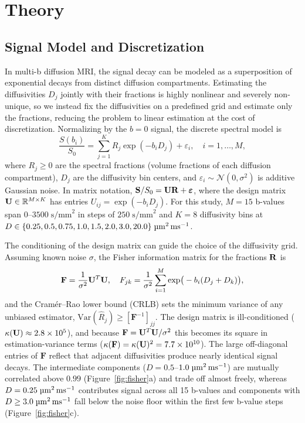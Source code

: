 \section{Theory}

\subsection{Signal Model and Discretization}

In multi-b diffusion MRI, the signal decay can be modeled as a superposition of exponential decays from distinct diffusion compartments. Estimating the diffusivities $D_j$ jointly with their fractions is highly nonlinear and severely non-unique, so we instead fix the diffusivities on a predefined grid and estimate only the fractions, reducing the problem to linear estimation at the cost of discretization. Normalizing by the $b = 0$ signal, the discrete spectral model is
%
\begin{equation}
  \frac{S(b_i)}{S_0} = \sum_{j=1}^{K} R_j \exp(-b_i D_j) + \varepsilon_i,
  \quad i = 1, \ldots, M,
  \label{eq:signal_model}
\end{equation}
%
where $R_j \geq 0$ are the spectral fractions (volume fractions of each diffusion compartment), $D_j$ are the diffusivity bin centers, and $\varepsilon_i \sim \mathcal{N}(0, \sigma^2)$ is additive Gaussian noise.
In matrix notation, $\mathbf{S} / S_0 = \mathbf{U} \mathbf{R} + \boldsymbol{\varepsilon}$, where the design matrix $\mathbf{U} \in \mathbb{R}^{M \times K}$ has entries $U_{ij} = \exp(-b_i D_j)$.
For this study, $M = 15$ b-values span $0$--$3500\;\text{s/mm}^2$ in steps of $250\;\text{s/mm}^2$ and $K = 8$ diffusivity bins at $D \in \{0.25, 0.5, 0.75, 1.0, 1.5, 2.0, 3.0, 20.0\}\;\si{\micro\meter\squared\per\milli\second}$.

The conditioning of the design matrix can guide the choice of the diffusivity grid.
Assuming known noise $\sigma$, the Fisher information matrix for the fractions $\mathbf{R}$ is
%
\begin{equation}
  \mathbf{F} = \frac{1}{\sigma^2} \mathbf{U}^T \mathbf{U},
  \quad F_{jk} = \frac{1}{\sigma^2} \sum_{i=1}^{M} \exp\!\big(-b_i(D_j + D_k)\big),
  \label{eq:fisher}
\end{equation}
%
and the Cram\'er--Rao lower bound (CRLB) sets the minimum variance of any unbiased estimator, $\text{Var}(\hat{R}_j) \geq [\mathbf{F}^{-1}]_{jj}$.
The design matrix is ill-conditioned ($\kappa(\mathbf{U}) \approx 2.8 \times 10^5$), and because $\mathbf{F} = \mathbf{U}^T\mathbf{U}/\sigma^2$ this becomes its square in estimation-variance terms ($\kappa(\mathbf{F}) = \kappa(\mathbf{U})^2 = 7.7 \times 10^{10}$).
The large off-diagonal entries of $\mathbf{F}$ reflect that adjacent diffusivities produce nearly identical signal decays. The intermediate components ($D = 0.5$--$1.0\;\si{\micro\meter\squared\per\milli\second}$) are mutually correlated above $0.99$ (Figure~\ref{fig:fisher}a) and trade off almost freely, whereas $D = 0.25\;\si{\micro\meter\squared\per\milli\second}$ contributes signal across all 15 b-values and components with $D \geq 3.0\;\si{\micro\meter\squared\per\milli\second}$ fall below the noise floor within the first few b-value steps (Figure~\ref{fig:fisher}c).

